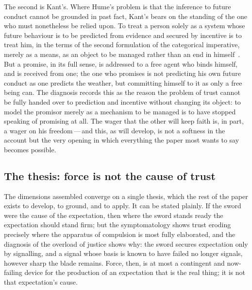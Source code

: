 The second is Kant's. Where Hume's problem is that the inference to future conduct cannot be grounded in past fact, Kant's bears on the standing of the one who must nonetheless be relied upon. To treat a person solely as a system whose future behaviour is to be predicted from evidence and secured by incentive is to treat him, in the terms of the second formulation of the categorical imperative, merely as a means, as an object to be managed rather than an end in himself~\parencite{kant1998}. But a promise, in its full sense, is addressed to a free agent who binds himself, and is received from one; the one who promises is not predicting his own future conduct as one predicts the weather, but committing himself to it as only a free being can. The diagnosis records this as the reason the problem of trust cannot be fully handed over to prediction and incentive without changing its object: to model the promisor merely as a mechanism to be managed is to have stopped speaking of promising at all. The wager that the other will keep faith is, in part, a wager on his freedom\,---\,and this, as  will develop, is not a softness in the account but the very opening in which everything the paper most wants to say becomes possible.

\subsection{The thesis: force is not the cause of trust}
\label{p13:sub:diag-thesis}

The dimensions assembled converge on a single thesis, which the rest of the paper exists to develop, to ground, and to apply. It can be stated plainly.  If the sword were the cause of the expectation, then where the sword stands ready the expectation should stand firm; but the symptomatology shows trust eroding precisely where the apparatus of compulsion is most fully elaborated, and the diagnosis of the overload of justice shows why: the sword secures expectation only by signalling, and a signal whose basis is known to have failed no longer signals, however sharp the blade remains. Force, then, is at most a contingent and now-failing device for the production of an expectation that is the real thing; it is not that expectation's cause.

